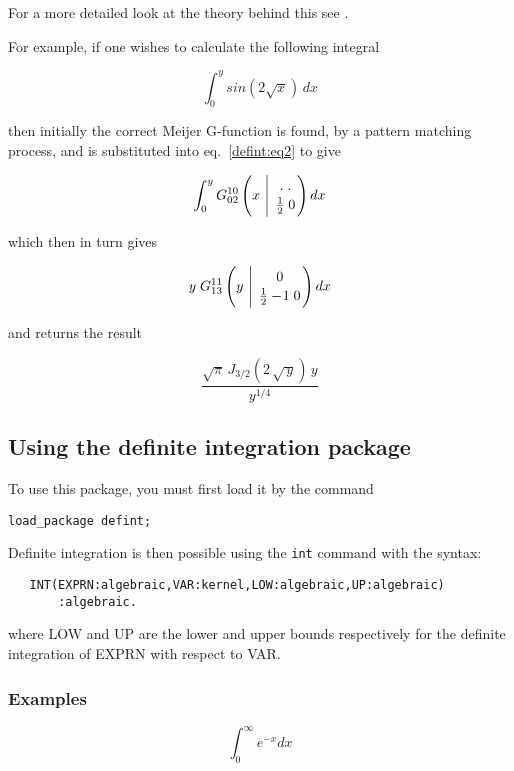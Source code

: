 For a more detailed look at the theory behind this see 
\cite{Adamchik90}.

For example, if one wishes to calculate the following integral

\begin{displaymath}
\int_{0}^{y} sin(2 \sqrt{x}) \, dx 
\end{displaymath}

then initially the correct Meijer G-function is found, by a pattern 
matching process, and is substituted 
into eq.~\ref{defint:eq2} to give

\begin{displaymath}
\int_{0}^{y} G^{1 0}_{0 2}\left(x 
\ \Bigg\vert \ \MeijerGparams{. \; .}{\frac{1}{2} \; 0} \right) dx
\end{displaymath}

which then in turn gives

\begin{displaymath}
y \; G^{1 1}_{1 3}\left(y \ \Bigg\vert \ \MeijerGparams{0}{\frac{1}{2} -\!1 \; 0} \right) dx
\end{displaymath}

and returns the result

\begin{displaymath}
\frac{\sqrt{\pi} \, J_{3/2}(2 \, \sqrt{\,y}) \, y}{y^{1/4}}
\end{displaymath}

\subsection{Using the definite integration package}
To use this package, you must first load it by the command
\begin{verbatim}
load_package defint;
\end{verbatim}
Definite integration is then possible using the \verb+int+
command with the syntax:
\begin{verbatim}
   INT(EXPRN:algebraic,VAR:kernel,LOW:algebraic,UP:algebraic)
       :algebraic.
\end{verbatim}
where LOW and UP are the lower and upper bounds respectively for
the definite integration of EXPRN with respect to VAR.

\subsubsection{Examples}

\begin{displaymath}
\int_{0}^{\infty} e^{-x} dx 
\end{displaymath}


